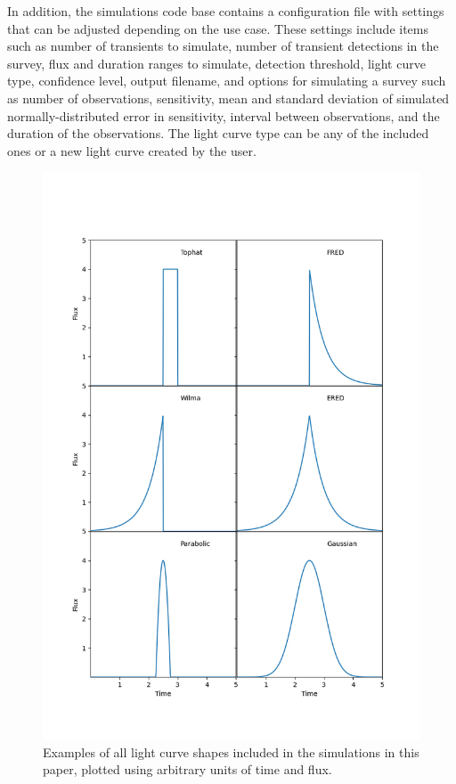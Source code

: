 \documentclass[12pt]{article}
\begin{document}
In addition, the simulations code base contains a configuration file with settings that can be adjusted depending on the use case. These settings include items such as number of transients to simulate, number of transient detections in the survey, flux and duration ranges to simulate, detection threshold, light curve type, confidence level, output filename, and options for simulating a survey such as number of observations, sensitivity, mean and standard deviation of simulated normally-distributed error in sensitivity, interval between observations, and the duration of the observations. The light curve type can be any of the included ones or a new light curve created by the user. 


\begin{figure}
\includegraphics[width=0.8\columnwidth]{multilcexample.png}
\caption{Examples of all light curve shapes included in the simulations in this paper, plotted using arbitrary units of time and flux.}
\label{multilc}
 \end{figure}
\end{document}

